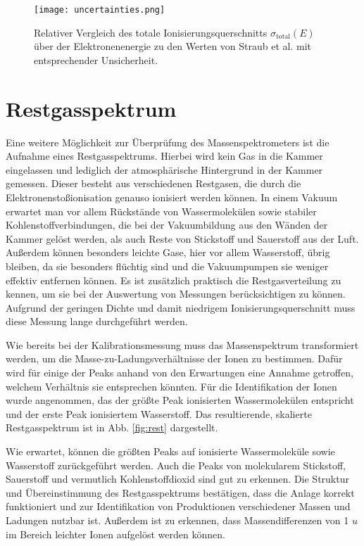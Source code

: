 \begin{figure}
    \centering
    \texttt{[image: uncertainties.png]}
    \caption[Relativer Vergleich des totalen Ionisierungsquerschnitts mit Straub et al.]{Relativer Vergleich des totale Ionisierungsquerschnitts $\sigma_\text{total}(E)$ über der Elektronenenergie zu den Werten von Straub et al. \cite{Straub} mit entsprechender Unsicherheit.}
    \label{fig:uncertainties}
\end{figure}

\section{Restgasspektrum}
\label{sec:Restgasspektrum}
Eine weitere Möglichkeit zur Überprüfung des Massenspektrometers ist die Aufnahme eines Restgasspektrums. Hierbei wird kein Gas in die Kammer eingelassen und lediglich der atmosphärische Hintergrund in der Kammer gemessen. Dieser besteht aus verschiedenen Restgasen, die durch die Elektronenstoßionisation genauso ionisiert werden können. In einem Vakuum erwartet man vor allem Rückstände von Wassermolekülen sowie stabiler Kohlenstoffverbindungen, die bei der Vakuumbildung aus den Wänden der Kammer gelöst werden, als auch Reste von Stickstoff und Sauerstoff aus der Luft. Außerdem können besonders leichte Gase, hier vor allem Wasserstoff, übrig bleiben, da sie besonders flüchtig sind und die Vakuumpumpen sie weniger effektiv entfernen können. Es ist zusätzlich praktisch die Restgasverteilung zu kennen, um sie bei der Auswertung von Messungen berücksichtigen zu können. Aufgrund der geringen Dichte und damit niedrigem Ionisierungsquerschnitt muss diese Messung lange durchgeführt werden. 

Wie bereits bei der Kalibrationsmessung muss das Massenspektrum transformiert werden, um die Masse-zu-Ladungsverhältnisse der Ionen zu bestimmen. Dafür wird für einige der Peaks anhand von den Erwartungen eine Annahme getroffen, welchem Verhältnis sie entsprechen könnten. Für die Identifikation der Ionen wurde angenommen, das der größte Peak ionisierten Wassermolekülen
entspricht und der erste Peak ionisiertem Wasserstoff. Das resultierende, skalierte Restgasspektrum ist in Abb. \ref{fig:rest} dargestellt.

Wie erwartet, können die größten Peaks auf ionisierte Wassermoleküle sowie Wasserstoff zurückgeführt werden. Auch die Peaks von molekularem Stickstoff, Sauerstoff und vermutlich Kohlenstoffdioxid sind gut zu erkennen. Die Struktur und Übereinstimmung des Restgasspektrums bestätigen, dass die Anlage korrekt funktioniert und zur Identifikation von Produktionen verschiedener Massen und Ladungen nutzbar ist. Außerdem ist zu erkennen, dass Massendifferenzen von 1 $u$ im Bereich leichter Ionen aufgelöst werden können. 

